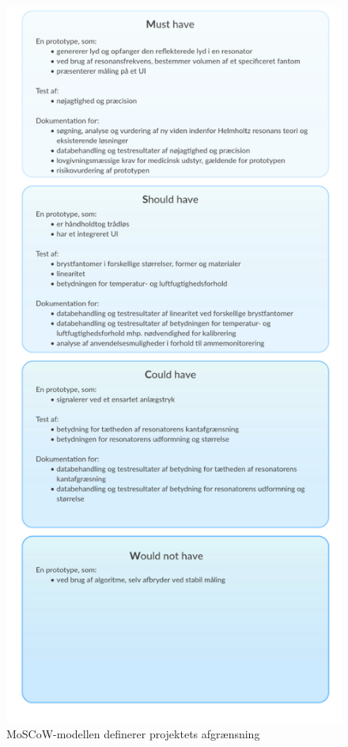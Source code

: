 	\begin{figure}[htb]
				\centering
					\includegraphics[width=5in]{storrusser}
					\caption{MoSCoW-modellen definerer projektets afgrænsning}
					\label{fig:MoSCoW}
	\end{figure}	
		
